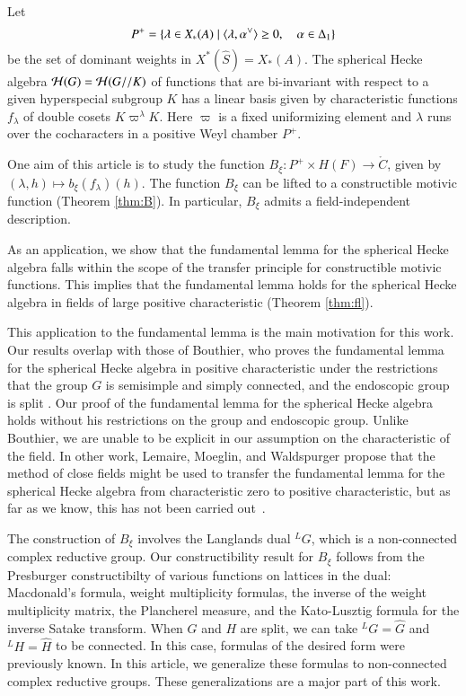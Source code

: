 Let 
\[
P^+ = \{\lambda\in X_*(A) \mid \langle{\lambda,\alpha^\vee}\rangle\ge 0,\quad \alpha\in \Delta_1\}
\]
be the set of dominant weights in $X^*(\hat S)=X_*(A)$.
The spherical Hecke algebra $\mathcal H(G)=\mathcal H(G//K)$ of functions that are bi-invariant with respect
to a given hyperspecial subgroup $K$ has a linear basis given by characteristic functions $f_\lambda$
of double cosets $K\varpi^\lambda K$.  Here $\varpi$ is a fixed uniformizing element and $\lambda$
runs over the cocharacters in a positive Weyl chamber $P^+$.

One aim of this article is to study the function $B_\xi:P^+\times H(F)\to \ring{C}$, given by
$(\lambda,h)\mapsto b_\xi(f_\lambda)(h)$.   The function $B_\xi$ can be lifted to a constructible motivic
function (Theorem \ref{thm:B}).   In particular, $B_\xi$ admits a field-independent description.  

As an application, we show that the fundamental lemma for the spherical Hecke algebra falls within
the scope of the transfer principle for constructible motivic functions.
This implies that the fundamental lemma holds for the spherical Hecke algebra in fields of large positive
characteristic (Theorem \ref{thm:fl}).

This application to the fundamental lemma is the main motivation for this work.  Our results overlap with
those of Bouthier, who proves the fundamental lemma for the spherical Hecke algebra in positive
characteristic under the restrictions that the group $G$ is semisimple and simply connected, 
and the endoscopic group is split \cite[Theorem~0.2]{bouthier}.  Our proof of the fundamental lemma for the
spherical Hecke algebra holds without his restrictions on the group and endoscopic group.
Unlike Bouthier, we are unable to be explicit in our assumption
on the characteristic of the field.  In other work,
Lemaire, Moeglin, and Waldspurger propose that the method of close fields might be used to transfer the
fundamental lemma for the spherical Hecke algebra from characteristic zero to positive characteristic, but as far as we know, 
this has not been
carried out~\cite[\S1.3]{LMW}.

The construction of $B_\xi$ involves the Langlands dual ${}^LG$, which is a non-connected complex reductive group.
Our constructibility result for $B_\xi$ follows from the  Presburger constructibilty of various
functions on lattices in the dual:  Macdonald's formula, weight multiplicity formulas, the inverse of the weight multiplicity matrix,
the Plancherel measure,
and the Kato-Lusztig formula for the inverse Satake transform.  
When $G$ and $H$ are split, we can take ${}^LG = \hat G$ and ${}^LH=\hat H$ to be connected.  In this case,
formulas of the desired form were previously known.  In this article, we
generalize these formulas to non-connected complex reductive groups.
These generalizations are a major part of this work.

